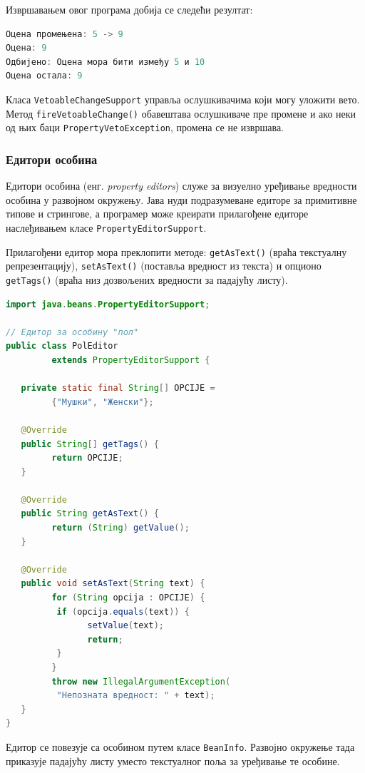 Извршавањем овог програма добија се следећи резултат:


\begin{lstlisting}[language=Java]
Оцена промењена: 5 -> 9
Оцена: 9
Одбијено: Оцена мора бити између 5 и 10
Оцена остала: 9
\end{lstlisting}


Класа \texttt{VetoableChangeSupport} управља ослушкивачима који могу уложити вето. Метод \texttt{fireVetoableChange()} обавештава ослушкиваче пре промене и ако неки од њих баци \texttt{PropertyVetoException}, промена се не извршава.


\subsubsection{Едитори особина}

Едитори особина (енг. \textit{property editors}) служе за визуелно уређивање вредности особина у развојном окружењу. Јава нуди подразумеване едиторе за примитивне типове и стрингове, а програмер може креирати прилагођене едиторе наслеђивањем класе \texttt{PropertyEditorSupport}.

Прилагођени едитор мора преклопити методе: \texttt{getAsText()} (враћа текстуалну репрезентацију), \texttt{setAsText()} (поставља вредност из текста) и опционо \texttt{getTags()} (враћа низ дозвољених вредности за падајућу листу).


\begin{lstlisting}[language=Java]
import java.beans.PropertyEditorSupport;
 
// Едитор за особину "пол"
public class PolEditor
         extends PropertyEditorSupport {
 
   private static final String[] OPCIJE =
         {"Мушки", "Женски"};
 
   @Override
   public String[] getTags() {
         return OPCIJE;
   }
 
   @Override
   public String getAsText() {
         return (String) getValue();
   }
 
   @Override
   public void setAsText(String text) {
         for (String opcija : OPCIJE) {
          if (opcija.equals(text)) {
                setValue(text);
                return;
          }
         }
         throw new IllegalArgumentException(
          "Непозната вредност: " + text);
   }
}
\end{lstlisting}


Едитор се повезује са особином путем класе \texttt{BeanInfo}. Развојно окружење тада приказује падајућу листу уместо текстуалног поља за уређивање те особине.


